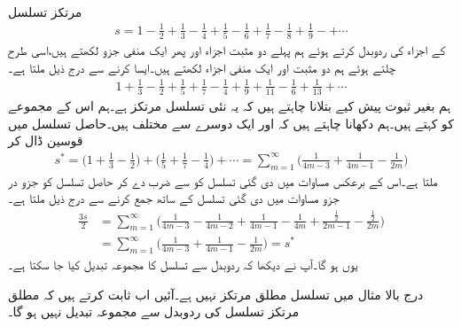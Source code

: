 \quad {}\\
مرتکز تسلسل
\begin{align*}
s=1-\frac{1}{2}+\frac{1}{3}-\frac{1}{4}+\frac{1}{5}-\frac{1}{6}+\frac{1}{7}-\frac{1}{8}+\frac{1}{9}-+\cdots
\end{align*}
کے اجزاء کی ردوبدل  کرتے ہوئے  ہم پہلے دو مثبت اجزاء اور پھر ایک منفی جزو لکھتے ہیں،اسی طرح چلتے ہوئے ہم دو مثبت اور ایک منفی اجزاء لکھتے ہیں۔ایسا کرنے سے درج ذیل ملتا ہے۔
\begin{align*}
1+\frac{1}{3}-\frac{1}{2}+\frac{1}{5}+\frac{1}{7}-\frac{1}{4}+\frac{1}{9}+\frac{1}{11}-\frac{1}{6}+\frac{1}{13}+\cdots
\end{align*} 
ہم بغیر ثبوت پیش کیے بتلانا چاہتے ہیں کہ یہ نئی تسلسل مرتکز ہے۔ہم اس کے مجموعے کو  کہتے ہیں۔ہم دکھانا چاہتے ہیں کہ  اور  ایک دوسرے سے مختلف ہیں۔حاصل تسلسل میں قوسین ڈال کر 
\begin{align*}
s^*=\big(1+\frac{1}{3}-\frac{1}{2}\big)+\big(\frac{1}{5}+\frac{1}{7}-\frac{1}{4}\big)+\cdots=\sum\limits_{m=1}^{\infty}\big(\frac{1}{4m-3}+\frac{1}{4m-1}-\frac{1}{2m}\big)
\end{align*}
ملتا ہے۔اس کے برعکس  مساوات  میں دی گئی تسلسل کو  سے ضرب دے کر حاصل تسلسل کو جزو در جزو   مساوات  میں دی گئی تسلسل کے ساتھ جمع کرنے سے درج ذیل ملتا ہے۔
\begin{align*}
\frac{3s}{2}&=\sum\limits_{m=1}^{\infty} \big(\frac{1}{4m-3}-\frac{1}{4m-2}+\frac{1}{4m-1}-\frac{1}{4m}+\frac{\tfrac{1}{2}}{2m-1}-\frac{\tfrac{1}{2}}{2m}\big)\\
&=\sum\limits_{m=1}^{\infty}\big(\frac{1}{4m-3}+\frac{1}{4m-1}-\frac{1}{2m}\big)=s^*
\end{align*}
یوں  ہو گا۔آپ نے دیکھا کہ ردوبدل سے تسلسل کا مجموعہ تبدیل کیا جا سکتا ہے۔

درج بالا مثال میں تسلسل مطلق مرتکز نہیں ہے۔آئیں اب ثابت کرتے ہیں کہ مطلق مرتکز تسلسل کی ردوبدل سے  مجموعہ تبدیل نہیں ہو گا۔

